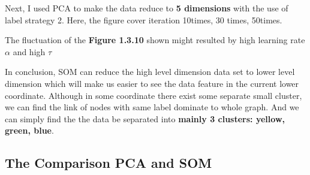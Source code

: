 \documentclass[titlepage,a4paper,12pt,thmsb]{report}
\begin{document}
\newpage

Next, I used PCA to make the data reduce to {\bf 5 dimensions} with the use of  label strategy 2. Here, the figure cover iteration 10times, 30 times, 50times.

\begin{center}
\begin{figure}[h]
{\par}
\end{figure}
{}
\end{center}
\newpage
\begin{center}
\begin{figure}[h]
{\par}
\end{figure}
{}
\end{center}

\begin{center}
\begin{figure}[h]
{\par}
\end{figure}
{}
\end{center}
\newpage
\begin{center}
\begin{figure}[h]
{\par}
\end{figure}
{}
\end{center}
The fluctuation of the {\bf Figure 1.3.10} shown might resulted by high learning rate $\alpha$ and high $\tau$

In conclusion, SOM can reduce the high level dimension data set to lower level dimension which will make us easier to see the data feature in the current lower coordinate. Although in some coordinate there exist some separate small cluster,  we can find the link of nodes with same label dominate to whole graph.  And we can simply find the the data be separated into {\bf mainly 3 clusters: yellow, green, blue}.


\newpage

\subsection{The Comparison PCA and SOM}
\end{document}
